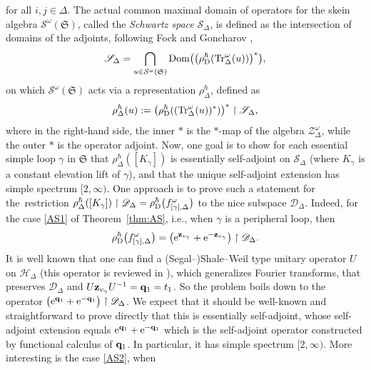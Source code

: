 \documentclass[10pt,a4paper]{amsart}
\numberwithin{equation}{section}
\theoremstyle{definition}
\begin{document}
 for all $i,j \in \Delta$. The actual common maximal domain of operators for the skein algebra $\mathcal{S}^\omega(\mathfrak{S})$, called the {\em Schwartz space} $\mathscr{S}_\Delta$, is defined as the intersection of domains of the adjoints, following Fock and Goncharov \cite{FG09},
\begin{align}
\label{eq:Schwartz}
\mathscr{S}_\Delta = \bigcap_{u \in \mathcal{S}^\omega(\mathfrak{S})} {\rm Dom}\bigl( \bigl(\rho^\hbar_{\rm D}( {\rm Tr}^\omega_\Delta(u))\bigr)^* \bigr),
\end{align}
on which $\mathcal{S}^\omega(\mathfrak{S})$ acts via a representation $\rho^\hbar_\Delta$, defined as
\[
\rho^\hbar_\Delta(u) := \bigl(\rho^\hbar_{\rm D}(({\rm Tr}^\omega_\Delta(u))^*)\bigr)^* \restriction \mathscr{S}_\Delta,
\]
where in the right-hand side, the inner $*$ is the $*$-map of the algebra $\mathcal{Z}^\omega_\Delta$, while the outer $*$ is the operator adjoint.
Now, one goal is to show for each essential simple loop $\gamma$ in $\mathfrak{S}$ that $\rho^\hbar_\Delta([K_\gamma])$ is essentially self-adjoint on $\mathscr{S}_\Delta$ (where $K_\gamma$ is a constant elevation lift of $\gamma$), and that the unique self-adjoint extension  has simple spectrum $[2,\infty)$. One approach is to prove such a statement for the~restriction $\rho^\hbar_\Delta([K_\gamma])\restriction \mathscr{D}_\Delta = \rho^\hbar_{\rm D}\bigl(f^\omega_{[\gamma],\Delta}\bigr)$ to the nice subspace $\mathscr{D}_\Delta$.
Indeed, for the case \ref{AS1} of Theorem~\ref{thm:AS}, i.e., when $\gamma$ is a peripheral loop, then
\[
\rho^\hbar_{\rm D}\bigl(f^\omega_{[\gamma],\Delta}\bigr) = \bigl( {\rm e}^{{\bf z}_{v_\gamma}} + {\rm e}^{-{\bf z}_{v_\gamma}} \bigr) \restriction \mathscr{D}_\Delta.
\]
It is well known that one can find a (Segal--)Shale--Weil type unitary operator $U$ on $\mathscr{H}_\Delta$ (this operator is reviewed in \cite{Kim_irreducible}), which generalizes Fourier transforms, that preserves $\mathscr{D}_\Delta$ and $U {\bf z}_{v_\gamma} U^{-1} = {\bf q}_1 = t_1$. So the problem boils down to the operator $\bigl({\rm e}^{{\bf q}_1} + {\rm e}^{-{\bf q}_1}\bigr) \restriction \mathscr{D}_\Delta$. We expect that it should be well-known and straightforward to prove directly that this is essentially self-adjoint, whose self-adjoint extension equals ${\rm e}^{{\bf q}_1} + {\rm e}^{-{\bf q}_1}$ which is the self-adjoint operator constructed by functional calculus of ${\bf q}_1$. In particular, it has simple spectrum $[2,\infty)$.
More interesting is the case \ref{AS2}, when
\end{document}
